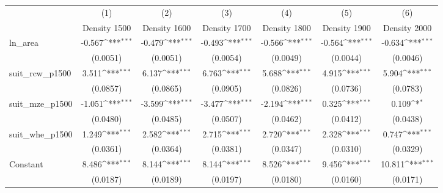 {
\def\sym#1{\ifmmode^{#1}\else\(^{#1}\)\fi}
\begin{tabular}{l*{6}{c}}
\toprule
                    &\multicolumn{1}{c}{(1)}&\multicolumn{1}{c}{(2)}&\multicolumn{1}{c}{(3)}&\multicolumn{1}{c}{(4)}&\multicolumn{1}{c}{(5)}&\multicolumn{1}{c}{(6)}\\
                    &\multicolumn{1}{c}{Density 1500}&\multicolumn{1}{c}{Density 1600}&\multicolumn{1}{c}{Density 1700}&\multicolumn{1}{c}{Density 1800}&\multicolumn{1}{c}{Density 1900}&\multicolumn{1}{c}{Density 2000}\\
\midrule
ln\_area             &      -0.567\sym{***}&      -0.479\sym{***}&      -0.493\sym{***}&      -0.566\sym{***}&      -0.564\sym{***}&      -0.634\sym{***}\\
                    &    (0.0051)         &    (0.0051)         &    (0.0054)         &    (0.0049)         &    (0.0044)         &    (0.0046)         \\
\addlinespace
suit\_rcw\_p1500      &       3.511\sym{***}&       6.137\sym{***}&       6.763\sym{***}&       5.688\sym{***}&       4.915\sym{***}&       5.904\sym{***}\\
                    &    (0.0857)         &    (0.0865)         &    (0.0905)         &    (0.0826)         &    (0.0736)         &    (0.0783)         \\
\addlinespace
suit\_mze\_p1500      &      -1.051\sym{***}&      -3.599\sym{***}&      -3.477\sym{***}&      -2.194\sym{***}&       0.325\sym{***}&       0.109\sym{*}  \\
                    &    (0.0480)         &    (0.0485)         &    (0.0507)         &    (0.0462)         &    (0.0412)         &    (0.0438)         \\
\addlinespace
suit\_whe\_p1500      &       1.249\sym{***}&       2.582\sym{***}&       2.715\sym{***}&       2.720\sym{***}&       2.328\sym{***}&       0.747\sym{***}\\
                    &    (0.0361)         &    (0.0364)         &    (0.0381)         &    (0.0347)         &    (0.0310)         &    (0.0329)         \\
\addlinespace
Constant            &       8.486\sym{***}&       8.144\sym{***}&       8.144\sym{***}&       8.526\sym{***}&       9.456\sym{***}&      10.811\sym{***}\\
                    &    (0.0187)         &    (0.0189)         &    (0.0197)         &    (0.0180)         &    (0.0160)         &    (0.0171)         \\

\end{tabular}}
